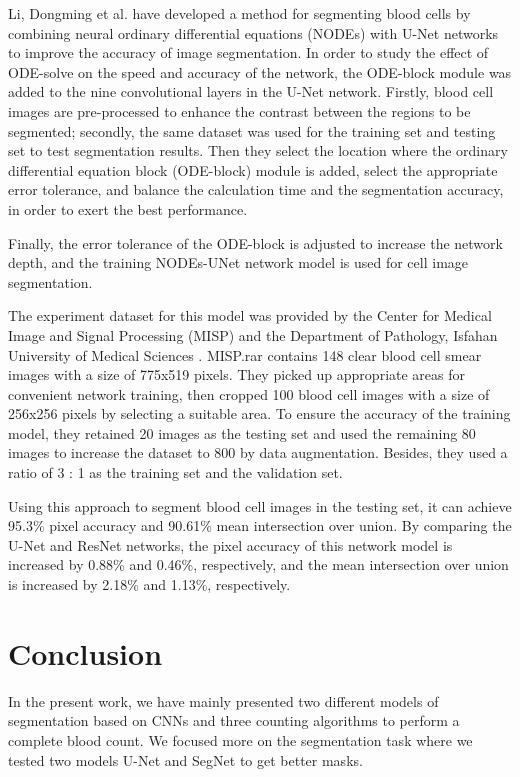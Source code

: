 \documentclass[conference]{IEEEtran}
\begin{document}
Li, Dongming et al. \cite{li2021robust} have developed a method for segmenting blood cells by combining neural ordinary differential equations (NODEs) with U-Net networks to improve the accuracy of image segmentation. In order to study the effect of ODE-solve on the speed and accuracy of the network, the ODE-block module was added to the nine convolutional layers in the U-Net network. Firstly, blood cell images are pre-processed to enhance the contrast between the regions to be segmented; secondly, the same dataset was used for the training set and testing set to test segmentation results. Then they select the location where the ordinary differential equation block (ODE-block) module is added, select the appropriate error tolerance, and balance the calculation time and the segmentation accuracy, in order to exert the best performance.\

Finally, the error tolerance of the ODE-block is adjusted to increase the network depth, and the training NODEs-UNet network model is used for cell image segmentation. 

The experiment dataset for this model was provided by the Center for Medical Image and Signal Processing (MISP) and the Department of Pathology, Isfahan University of Medical Sciences \cite{sarrafzadeh2014selection}. MISP.rar contains 148 clear blood cell smear images with a size of 775x519 pixels. They picked up appropriate areas for convenient network training, then cropped 100 blood cell images with a size of 256x256 pixels by selecting a suitable area. To ensure the accuracy of the training model, they retained 20 images as the testing set and used the remaining 80 images to increase the dataset to 800 by data augmentation. Besides, they used a ratio of 3 : 1 as the training set and the validation set.

Using this approach to segment blood cell images in the testing set, it can achieve 95.3\% pixel accuracy and 90.61\% mean intersection over union. By comparing the U-Net and ResNet networks, the pixel accuracy of this network model is increased by 0.88\% and 0.46\%, respectively, and the mean intersection over union is increased by 2.18\% and 1.13\%, respectively.

\section{Conclusion}

In the present work, we have mainly presented two different models of segmentation based on CNNs and three counting algorithms to perform a complete blood count.
We focused more on the segmentation task where  we tested two models U-Net and SegNet to get better masks. 
\end{document}
